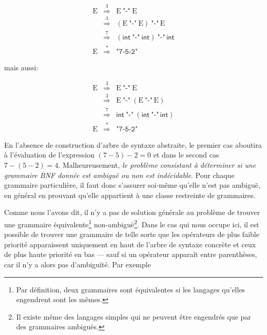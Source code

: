 \documentclass[11pt,a4paper]{article}
\newcommand{\str}[1]{\texttt{"{#1}"}}
\newcommand{\expand}[1]{\stackrel{#1}{\Longrightarrow}}
\begin{document}
\[
\begin{array}{rcl}
  \textrm{E} & \expand{3} & \textrm{E} \ \str{-} \ \textrm{E}\\
             & \expand{3} &
    (\textrm{E} \ \str{-} \ \textrm{E}) \ \str{-} \, \textrm{E}\\
             & \expand{7} &
    (\textsf{int}\ \str{-} \ \textsf{int}) \ \str{-} \, \textsf{int}\\
  \textrm{E} & \stackrel{*}{\Longrightarrow} & \str{7-5-2}
\end{array}
\]

\noindent mais aussi:

\[
\begin{array}{rcl}
  \textrm{E} & \expand{3} & \textrm{E} \ \str{-} \ \textrm{E}\\
             & \expand{3} &
    \textrm{E} \ \str{-} \ (\textrm{E} \ \str{-} \, \textrm{E})\\
             & \expand{7} &
    \textsf{int}\ \str{-} \ (\textsf{int} \ \str{-} \, \textsf{int})\\
  \textrm{E} & \stackrel{*}{\Longrightarrow} & \str{7-5-2}
\end{array}
\]

\noindent En l'absence de construction d'arbre de syntaxe abstraite,
le premier cas aboutira à l'évaluation de l'expression $(7 - 5) - 2 =
0$ et dans le second cas $7 - (5 - 2) = 4$. Malheureusement, \emph{le
problème consistant à déterminer si une grammaire BNF donnée est
ambiguë ou non est indécidable}. Pour chaque grammaire particulière,
il faut donc s'assurer soi-même qu'elle n'est pas ambiguë, en général
en prouvant qu'elle appartient à une classe restreinte de grammaires.

Comme nous l'avons dit, il n'y a pas de solution générale au problème
de trouver une grammaire équivalente\footnote{Par définition, deux
grammaires sont équivalentes si les langages qu'elles engendrent sont
les mêmes.} non-ambiguë\footnote{Il existe même des langages simples
qui ne peuvent être engendrés que par des grammaires ambiguës.}. Dans
le cas qui nous occupe ici, il est possible de trouver une grammaire
de telle sorte que les opérateurs de plus faible priorité apparaissent
uniquement en haut de l'arbre de syntaxe concrète et ceux de plus
haute priorité en bas --- sauf si un opérateur apparaît entre
parenthèses, car il n'y a alors pas d'ambiguïté. Par exemple

\label{left_rec}
\end{document}
